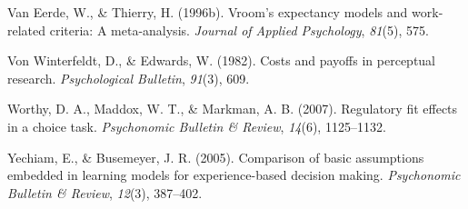 \documentclass[english,,man]{apa6}
\theoremstyle{definition}
\theoremstyle{definition}
\theoremstyle{definition}
\theoremstyle{remark}
\begin{document}
\leavevmode\hypertarget{ref-vaneerde1996}{}%
Van Eerde, W., \& Thierry, H. (1996b). Vroom's expectancy models and
work-related criteria: A meta-analysis. \emph{Journal of Applied
Psychology}, \emph{81}(5), 575.

\leavevmode\hypertarget{ref-von1982}{}%
Von Winterfeldt, D., \& Edwards, W. (1982). Costs and payoffs in
perceptual research. \emph{Psychological Bulletin}, \emph{91}(3), 609.

\leavevmode\hypertarget{ref-worthy2007}{}%
Worthy, D. A., Maddox, W. T., \& Markman, A. B. (2007). Regulatory fit
effects in a choice task. \emph{Psychonomic Bulletin \& Review},
\emph{14}(6), 1125--1132.

\leavevmode\hypertarget{ref-yechiam2005}{}%
Yechiam, E., \& Busemeyer, J. R. (2005). Comparison of basic assumptions
embedded in learning models for experience-based decision making.
\emph{Psychonomic Bulletin \& Review}, \emph{12}(3), 387--402.
\end{document}
